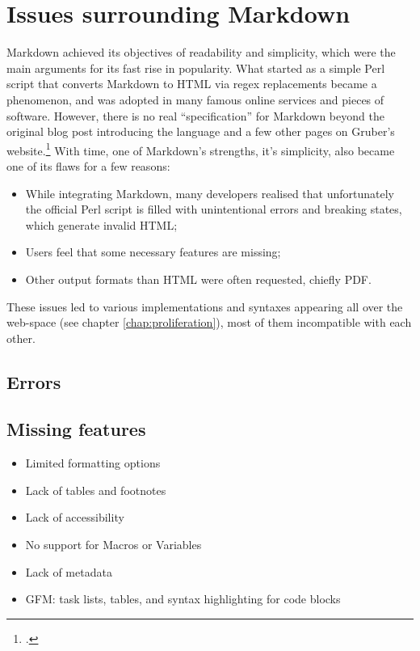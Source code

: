 \chapter{Issues surrounding Markdown}
\label{chap:issues}

\vspace{1cm}

Markdown achieved its objectives of readability and simplicity, which were the main arguments for its fast rise in popularity.
What started as a simple Perl script that converts Markdown to HTML via regex replacements became a phenomenon, and was adopted in many
famous online services and pieces of software. However, there is no real ``specification'' for Markdown beyond the original blog post
introducing the language and a few other pages on Gruber's website.\footcite{gruber2004markdown}
With time, one of Markdown's strengths, it's simplicity, also became one of its flaws for a few reasons:

\begin{itemize}
    \item While integrating Markdown, many developers realised that unfortunately the official Perl script is filled with unintentional errors
    and breaking states, which generate invalid HTML;
    \item Users feel that some necessary features are missing;
    \item Other output formats than HTML were often requested, chiefly PDF.
\end{itemize}

These issues led to various implementations and syntaxes appearing all over the web-space (see chapter \ref{chap:proliferation}),
most of them incompatible with each other.

\section{Errors}

\section{Missing features}

\begin{itemize}
    \item Limited formatting options
    \item Lack of tables and footnotes
    \item Lack of accessibility
    \item No support for Macros or Variables
    \item Lack of metadata
    \item GFM: task lists, tables, and syntax highlighting for code blocks
\end{itemize}

